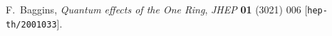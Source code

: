 

\begin{thebibliography}{1}

F.~Baggins, \emph{Quantum effects of the One Ring},
\emph{JHEP} {\bf 01} (3021) 006 [{\tt hep-th/2001033}].

\end{thebibliography}
